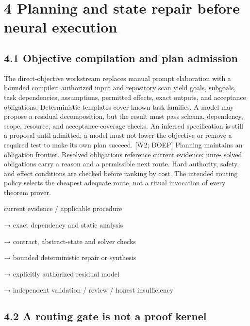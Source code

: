 \section*{4 Planning and state repair before neural execution}
\subsection*{4.1 Objective compilation and plan admission}

The direct-objective workstream replaces manual prompt elaboration with a bounded compiler:
authorized input and repository scan yield goals, subgoals, task dependencies, assumptions, permitted
effects, exact outputs, and acceptance obligations. Deterministic templates cover known task families.
A model may propose a residual decomposition, but the result must pass schema, dependency, scope,
resource, and acceptance-coverage checks. An inferred specification is still a proposal until admitted;
a model must not lower the objective or remove a required test to make its own plan succeed. [W2;
DOEP]
Planning maintains an obligation frontier. Resolved obligations reference current evidence; unre-
solved obligations carry a reason and a permissible next route. Hard authority, safety, and effect
conditions are checked before ranking by cost. The intended routing policy selects the cheapest
adequate route, not a ritual invocation of every theorem prover.

\noindent current evidence / applicable procedure\par
\noindent → exact dependency and static analysis\par
\noindent → contract, abstract-state and solver checks\par
\noindent → bounded deterministic repair or synthesis\par
\noindent → explicitly authorized residual model\par
\noindent → independent validation / review / honest insufficiency\par

\subsection*{4.2 A routing gate is not a proof kernel}


